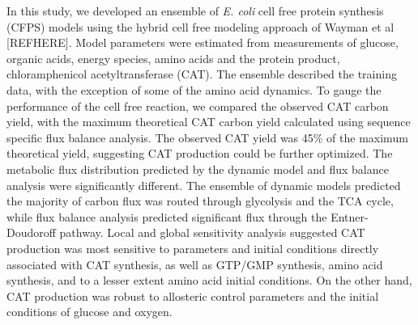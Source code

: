 \documentclass[12pt]{article}
\begin{document}
In this study, we developed an ensemble of \textit{E. coli} cell free protein synthesis (CFPS) models using the hybrid cell free modeling approach of Wayman et al [REFHERE].
Model parameters were estimated from measurements of glucose, organic acids, energy species, amino acids and the protein product, chloramphenicol acetyltransferase (CAT).
The ensemble described the training data, with the exception of some of the amino acid dynamics.
To gauge the performance of the cell free reaction, we compared the observed CAT carbon yield, with the maximum theoretical CAT carbon yield calculated using sequence specific flux
balance analysis. The observed CAT yield was 45\% of the maximum theoretical yield, suggesting CAT production could be further optimized.
The metabolic flux distribution predicted by the dynamic model and flux balance analysis were significantly different.
The ensemble of dynamic models predicted the majority of carbon flux was routed through glycolysis and the TCA cycle,
while flux balance analysis predicted significant flux through the Entner-Doudoroff pathway.
Local and global sensitivity analysis suggested CAT production was most sensitive to parameters and initial conditions directly associated with CAT synthesis, as well as
GTP/GMP synthesis, amino acid synthesis, and to a lesser extent amino acid initial conditions.
On the other hand, CAT production was robust to allosteric control parameters and the initial conditions of glucose and oxygen.

\end{document}
